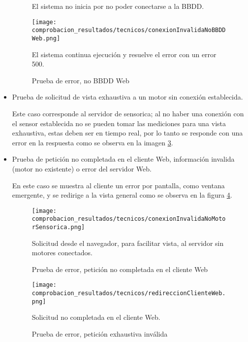 \begin{itemize}
\begin{figure}[H]
        El sistema no inicia por no poder conectarse a la BBDD.
        \label{img:NoBBDDSensorica}
	\end{figure}

    \begin{figure}[H]
		\centering
        \caption{Prueba de error, no BBDD Web}
        \texttt{[image: comprobacion\_resultados/tecnicos/conexionInvalidaNoBBDDWeb.png]}

        El sistema continua ejecución y resuelve el error con un error 500.
        \label{img:NoBBDDWeb}
	\end{figure}
%
    \item Prueba de solicitud de vista exhaustiva a un motor sin conexión
        establecida.

        Este caso corresponde al servidor de sensorica; al no haber una conexión
        con el sensor establecida no se pueden tomar las mediciones para una vista
        exhaustiva, estas deben ser en tiempo real, por lo tanto se responde
        con una error en la respuesta como se observa en la imagen \ref{img:ErrorExhaustiva}.
%

%
    \item Prueba de petición no completada en el cliente Web,
        información invalida (motor no existente) o error del servidor Web.

        En este caso se muestra al cliente un error por pantalla, como ventana
        emergente, y se redirige a la vista general como se observa en la
        figura \ref{img:SolicitudNoCompletada}.

    \begin{figure}[H]
		\centering
        \caption{Prueba de error, petición no completada en el cliente Web}
        \texttt{[image: comprobacion\_resultados/tecnicos/conexionInvalidaNoMotorSensorica.png]}

        Solicitud  desde el navegador, para facilitar vista, al servidor
        sin motores conectados.
        \label{img:ErrorExhaustiva}
	\end{figure}

    \begin{figure}[H]
		\centering
        \caption{Prueba de error, petición exhaustiva inválida}
        \texttt{[image: comprobacion\_resultados/tecnicos/redireccionClienteWeb.png]}

        Solicitud no completada en el cliente Web. \label{img:SolicitudNoCompletada}
	\end{figure}
\end{itemize}

